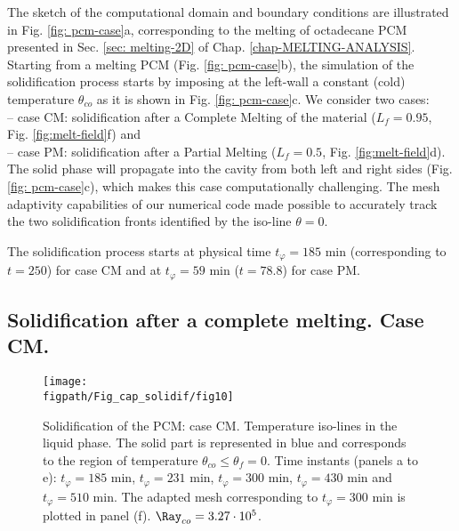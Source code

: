 The sketch of the computational domain and boundary conditions are illustrated in Fig. \ref{fig: pcm-case}a, corresponding to the melting of octadecane PCM presented in Sec. \ref{sec: melting-2D} of Chap. \ref{chap-MELTING-ANALYSIS}.
Starting from a melting PCM (Fig. \ref{fig: pcm-case}b), the simulation of the solidification process starts by imposing at the left-wall a constant (cold) temperature $\theta_{co}$ as it is shown in Fig. \ref{fig: pcm-case}c.
We consider two cases: \\ 
-- case CM: solidification after a Complete Melting of the material ($L_f=0.95$, Fig. \ref{fig:melt-field}f) and \\
-- case PM: solidification after a Partial Melting ($L_f=0.5$, Fig. \ref{fig:melt-field}d). \\
 The solid phase will propagate into the cavity from both left and right sides  (Fig. \ref{fig: pcm-case}c), which makes this case computationally challenging. The mesh adaptivity capabilities of our numerical code made possible to accurately track the 
two solidification fronts identified by the iso-line $\theta=0$.  

\noindent The solidification process starts at physical time $t_{\varphi} = 185 $ min (corresponding to $t = 250 $) for case CM and at $t_{\varphi} = 59$ min ($t = 78.8 $) for case PM. 

\subsection{Solidification after a complete melting. Case CM.} \label{sec_solid_full} 

\begin{figure}
	\begin{center}
		\texttt{[image: \\figpath/Fig\_cap\_solidif/fig10]}
	\end{center}
	\caption{Solidification of the PCM: case CM. 
	Temperature iso-lines in the liquid phase. 
	The solid part is represented in blue and corresponds to the region of temperature $\theta_{co} \leq \theta_f=0$. 
	Time instants (panels  a to e): $t_{\varphi} = 185$ min, $t_{\varphi} = 231$ min, $t_{\varphi} = 300$ min, $t_{\varphi} = 430$ min and $t_{\varphi} = 510$ min. 
	The adapted mesh corresponding to $t_{\varphi} = 300$ min is plotted in panel (f).  $\Ray_{co}=3.27 \cdot 10^5$. }\label{fig:evolution}
\end{figure}

